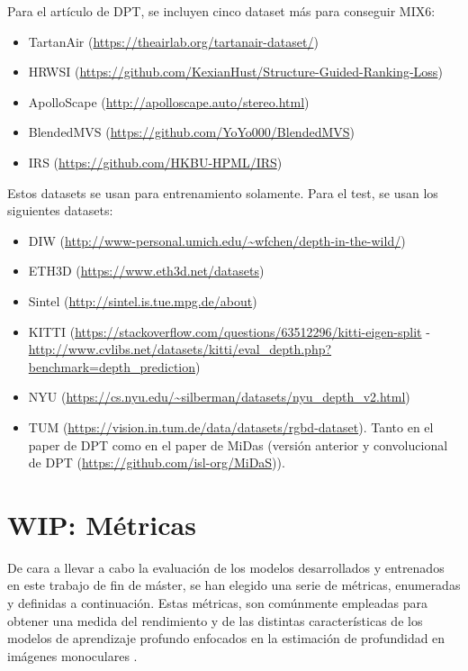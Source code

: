 \documentclass[a4paper]{article}
\begin{document}
Para el artículo de DPT, se incluyen cinco dataset más para conseguir MIX6:
\begin{itemize}
\item TartanAir (\url{https://theairlab.org/tartanair-dataset/})
\item HRWSI (\url{https://github.com/KexianHust/Structure-Guided-Ranking-Loss})
\item ApolloScape (\url{http://apolloscape.auto/stereo.html})
\item BlendedMVS (\url{https://github.com/YoYo000/BlendedMVS})
\item IRS (\url{https://github.com/HKBU-HPML/IRS})
\end{itemize}

Estos datasets se usan para entrenamiento solamente. Para el test, se usan los siguientes datasets: 

\begin{itemize}
\item DIW (\url{http://www-personal.umich.edu/~wfchen/depth-in-the-wild/})
\item ETH3D (\url{https://www.eth3d.net/datasets})
\item Sintel (\url{http://sintel.is.tue.mpg.de/about})
\item KITTI (\url{https://stackoverflow.com/questions/63512296/kitti-eigen-split} - \url{http://www.cvlibs.net/datasets/kitti/eval_depth.php?benchmark=depth_prediction})
\item NYU (\url{https://cs.nyu.edu/~silberman/datasets/nyu_depth_v2.html})
\item TUM (\url{https://vision.in.tum.de/data/datasets/rgbd-dataset}). 
Tanto en el paper de DPT como en el paper de MiDas (versión anterior y convolucional de DPT (\url{https://github.com/isl-org/MiDaS})).
\end{itemize}

\clearpage
\section{WIP: Métricas}

De cara a llevar a cabo la evaluación de los modelos desarrollados y entrenados en este trabajo de fin de máster, se han elegido una serie de métricas, enumeradas y definidas a continuación. Estas métricas, son comúnmente empleadas para obtener una medida del rendimiento y de las distintas características de los modelos de aprendizaje profundo enfocados en la estimación de profundidad en imágenes monoculares \cite{visiontransformersDPT,midas-intel,eigen-multi-scale,bts,DORN,bhat2020adabins,evaluation-cnn-depth-estimation, depth-estimation-metrics}.
\end{document}

